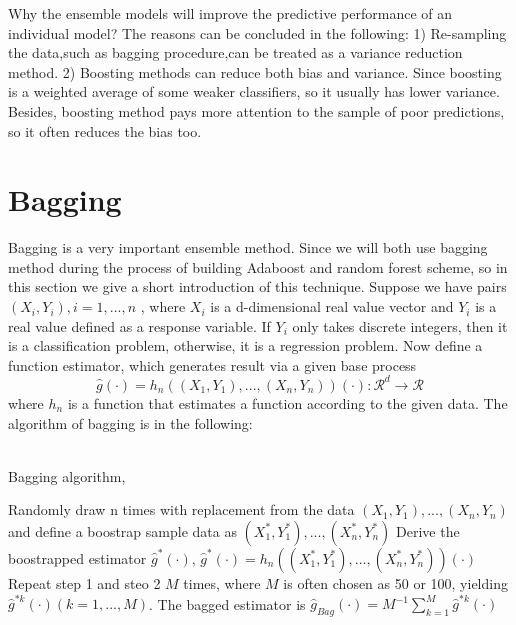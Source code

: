 Why the ensemble models will improve the predictive performance of an individual model? The reasons can be concluded in the following: 1) Re-sampling the data,such as bagging procedure,can be treated as a variance reduction method.\cite{buhlmann2012bagging} 2) Boosting methods can reduce both bias and variance. Since boosting is a weighted average of some weaker classifiers, so it usually has lower variance. Besides, boosting method pays more attention to the sample of poor predictions, so it often reduces the bias too.  
\section{Bagging}
Bagging is a very important ensemble method. Since we will both use bagging method during the process of building Adaboost and random forest scheme, so in this section we give a short introduction of this technique.
Suppose we have pairs $(X_i,Y_i), i=1,...,n$ , where $X_i$ is a d-dimensional real value vector and $Y_i$ is a real value defined as a response variable.  If $Y_i$ only takes discrete integers, then it is a classification problem, otherwise, it is a regression problem. Now define a function estimator, which generates result via a given base process \:
\begin{equation}
\hat{g}(\cdot)=h_n((X_1,Y_1),...,(X_n,Y_n))(\cdot):\mathcal{R}^d\rightarrow \mathcal{R}
\end{equation}  
where $h_n$ is a function that estimates a function according to the given data. 
The algorithm of bagging is in the following:\\
\\
\begin{algorithm}[H]
	\caption{Bagging algorithm,\cite{breiman1996bagging}}\label{alg:bagging}
	\nl Randomly draw n times with replacement from the data $(X_1,Y_1),...,(X_n,Y_n)$ and define a boostrap sample data as $(X_1^*,Y_1^*),...,(X_n^*,Y_n^*)$\;
	\nl Derive the boostrapped estimator $\hat{g}^*(\cdot)$, $\hat{g}^*(\cdot)=h_n((X_1^*,Y_1^*),...,(X_n^*,Y_n^*))(\cdot)$\;
	\nl Repeat step 1 and steo 2 $M$ times, where $M$ is often chosen as 50 or 100, yielding $\hat{g}^{*k}(\cdot) (k=1,...,M)$. The bagged estimator is $\hat{g}_{Bag}(\cdot)=M^{-1}\sum_{k=1}^{M}\hat{g}^{*k}(\cdot)$	
\end{algorithm}

